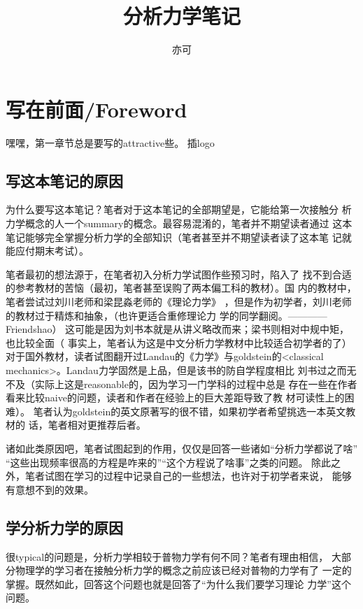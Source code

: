 \documentclass[a4paper, 10pt, openany]{book}%
\begin{document}
  \title{ \heiti 分析力学笔记}
  \author{亦可}
  \maketitle
  
 
\tableofcontents


  \newpage

  \chapter{写在前面/Foreword}

嘿嘿，第一章节总是要写的attractive些。
插logo
\section{写这本笔记的原因}
为什么要写这本笔记？笔者对于这本笔记的全部期望是，它能给第一次接触分
析力学概念的人一个summary的概念。最容易混淆的，笔者并不期望读者通过
这本笔记能够完全掌握分析力学的全部知识（笔者甚至并不期望读者读了这本笔
记就能应付期末考试）。

笔者最初的想法源于，在笔者初入分析力学试图作些预习时，陷入了
找不到合适的参考教材的苦恼（最初，笔者甚至误购了两本偏工科的教材）。国
内的教材中，笔者尝试过刘川老师和梁昆淼老师的《理论力学》
，但是作为初学者，刘川老师的教材过于精炼和抽象，（也许更适合重修理论力
学的同学翻阅。————Friendshao）
这可能是因为刘书本就是从讲义略改而来；梁书则相对中规中矩，也比较全面（
事实上，笔者认为这是中文分析力学教材中比较适合初学者的了）
对于国外教材，读者试图翻开过Landau的《力学》与goldstein的<classical 
mechanics>。Landau力学固然是上品，但是该书的防自学程度相比
刘书过之而无不及（实际上这是reasonable的，因为学习一门学科的过程中总是
存在一些在作者看来比较naive的问题，读者和作者在经验上的巨大差距导致了教
材可读性上的困难）。
笔者认为goldstein的英文原著写的很不错，如果初学者希望挑选一本英文教材的
话，笔者相对更推荐后者。

诸如此类原因吧，笔者试图起到的作用，仅仅是回答一些诸如“分析力学都说了啥”
“这些出现频率很高的方程是咋来的”“这个方程说了啥事”之类的问题。
除此之外，笔者试图在学习的过程中记录自己的一些想法，也许对于初学者来说，
能够有意想不到的效果。
\section{学分析力学的原因}
很typical的问题是，分析力学相较于普物力学有何不同？笔者有理由相信，
大部分物理学的学习者在接触分析力学的概念之前应该已经对普物的力学有了
一定的掌握。既然如此，回答这个问题也就是回答了“为什么我们要学习理论
力学”这个问题。
\end{document}
